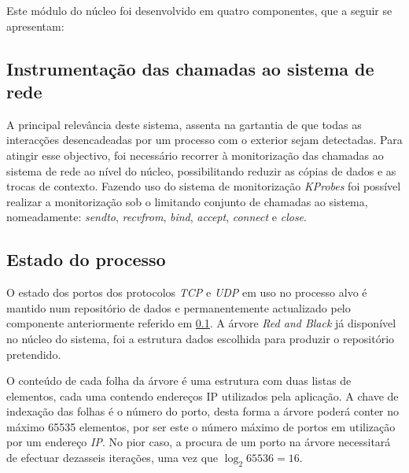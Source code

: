 Este módulo do núcleo foi desenvolvido em quatro componentes, que a seguir se apresentam:



\subsection{Instrumentação das chamadas ao sistema de rede}
\label{sub:mon_syscalls}

A principal relevância deste sistema, assenta na gartantia de que todas as interacções desencadeadas por um processo com o exterior sejam detectadas.
Para atingir esse objectivo, foi necessário recorrer à monitorização das chamadas ao sistema de rede ao nível do núcleo, possibilitando reduzir as cópias de dados e as trocas de contexto.
Fazendo uso do sistema de monitorização \textit{KProbes} foi possível realizar a monitorização sob o limitando conjunto de chamadas ao sistema, nomeadamente: \textit{sendto}, \textit{recvfrom}, \textit{bind}, \textit{accept}, \textit{connect} e \textit{close}.



\subsection{Estado do processo}
\label{sub:data_repository}

O estado dos portos dos protocolos \textit{TCP} e \textit{UDP} em uso no processo alvo é mantido num repositório de dados e permanentemente actualizado pelo componente anteriormente referido em \ref{sub:mon_syscalls}.
A árvore \textit{Red and Black} já disponível no núcleo do sistema, foi a estrutura dados escolhida para produzir o repositório pretendido.

O conteúdo de cada folha da árvore é uma estrutura com duas listas de elementos, cada uma contendo endereços IP utilizados pela aplicação.
A chave de indexação das folhas é o número do porto, desta forma a árvore poderá conter no máximo 65535 elementos, por ser este o número máximo de portos em utilização por um endereço \textit{IP}.
No pior caso, a procura de um porto na árvore necessitará de efectuar dezasseis iterações, uma vez que \begin{math}\log _2 65536 = 16 \end{math}.

